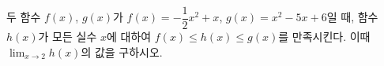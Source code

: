 두 함수 $f(x)$, $g(x)$가 $f(x)=-\dfrac{1}{2}x^2+x$, $g(x)=x^2-5x+6$일 때, 함수 $h(x)$가 모든 실수 $x$에 대하여 $f(x)\le h(x)\le g(x)$를 만족시킨다. 이때 $\displaystyle\lim_{x\to 2} h(x)$의 값을 구하시오.
